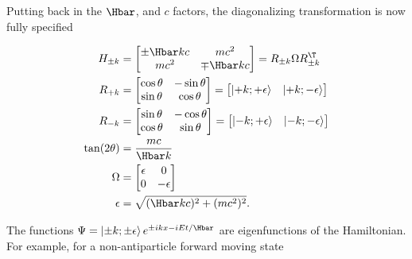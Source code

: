 Putting back in the \( \Hbar \), and \( c\) factors, the diagonalizing transformation is now fully specified

\begin{equation}\label{eqn:gradQuantumProblemSet4Problem3:520}
\begin{aligned}
H_{\pm k} &= 
\begin{bmatrix}
\pm \Hbar k c & m c^2 \\
m c^2 & \mp \Hbar k c
\end{bmatrix}
=
R_{\pm k} \Omega R_{\pm k}^\T \\
R_{+ k} &= 
\begin{bmatrix}
\cos\theta & -\sin\theta  \\
\sin\theta & \cos\theta
\end{bmatrix} 
=
\begin{bmatrix}
\ket{+k;+\epsilon} &
\ket{+k;-\epsilon}
\end{bmatrix}
\\
R_{- k} &= 
\begin{bmatrix}
\sin\theta & -\cos\theta  \\
\cos\theta & \sin\theta
\end{bmatrix} 
=
\begin{bmatrix}
\ket{-k;+\epsilon} &
\ket{-k;-\epsilon}
\end{bmatrix}
\\
\tan(2 \theta) &= \frac{m c}{\Hbar k} \\
\Omega &= 
\begin{bmatrix}
\epsilon & 0 \\
0 & -\epsilon
\end{bmatrix} \\
\epsilon &= \sqrt{(\Hbar k c)^2 + (m c^2)^2}.
\end{aligned}
\end{equation}

The functions \( \Psi = \ket{\pm k; \pm \epsilon} e^{\pm i k x - i E t/\Hbar} \) are eigenfunctions of the Hamiltonian.  For example, for a non-antiparticle forward moving state


